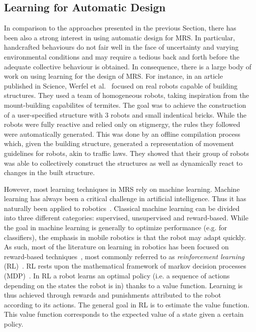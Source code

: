   \subsection{Learning for Automatic Design}

    In comparison to the approaches presented in the previous Section, there has been also a strong interest in using automatic design for MRS. In particular, handcrafted behaviours do not fair well in the face of uncertainty and varying environmental conditions and may require a tedious back and forth before the adequate collective behaviour is obtained. In consequence, there is a large body of work on using learning for the design of MRS. For instance, in an article published in Science, Werfel et al.~\parencite{Werfel2014} focused on real robots capable of building structures. They used a team of homogeneous robots, taking inspiration from the mount-building capabilites of termites. The goal was to achieve the construction of a user-specified structure with $3$ robots and small indentical bricks. While the robots were fully reactive and relied only on stigmergy, the rules they followed were automatically generated. This was done by an offline compilation process which, given the building structure, generated a representation of movement guidelines for robots, akin to traffic laws. They showed that their group of robots was able to collectively construct the structures as well as dynamically react to changes in the built structure.

    However, most learning techniques in MRS rely on machine learning. Machine learning has always been a critical challenge in artificial intelligence. Thus it has naturally been applied to robotics~\parencite{Hertzberg2008}. Classical machine learning can be divided into three different categories: supervised, unsupervised and reward-based. While the goal in machine learning is generally to optimize performance (e.g. for classifiers), the emphasis in mobile robotics is that the robot may adapt quickly. As such, most of the literature on learning in robotics has been focused on reward-based techniques~\parencite{Mataric2008}, most commonly referred to as \emph{reinforcement learning} (RL)~\parencite{Sutton1998}. RL rests upon the mathematical framework of markov decision processes (MDP)~\parencite{Bellman1957}. In RL a robot learns an optimal policy (i.e. a sequence of actions depending on the states the robot is in) thanks to a value function. Learning is thus achieved through rewards and punishments attributed to the robot according to its actions. The general goal in RL is to estimate the value function. This value function corresponds to the expected value of a state given a certain policy.

